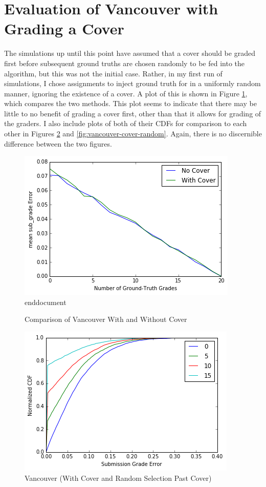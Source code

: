 \documentclass{article}
\begin{document}
	\section{Evaluation of Vancouver with Grading a Cover}
	The simulations up until this point have assumed that a cover should be graded first before subsequent ground truths are chosen randomly to be fed into the algorithm, but this was not the initial case. Rather, in my first run of simulations, I chose assignments to inject ground truth for in a uniformly random manner, ignoring the existence of a cover. A plot of this is shown in Figure \ref{fig:cover-vs-no-cover}, which compares the two methods. This plot seems to indicate that there may be little to no benefit of grading a cover first, other than that it allows for grading of the graders. I also include plots of both of their CDFs for comparison to each other in Figures \ref{fig:vancouver-no-cover} and \ref{fig:vancouver-cover-random}. Again, there is no discernible difference between the two figures.
	
		
	\begin{figure}[h]
		\includegraphics{cover-vs-no-cover.png}end{document}
		\caption{Comparison of Vancouver With and Without Cover}
		\label{fig:cover-vs-no-cover}
	\end{figure}
	
	\begin{figure}[h]
		\includegraphics{vancouver-no-cover.png}
		\caption{Vancouver (With Cover and Random Selection Past Cover)}
		\label{fig:vancouver-no-cover}
	\end{figure}
	
\end{document}
